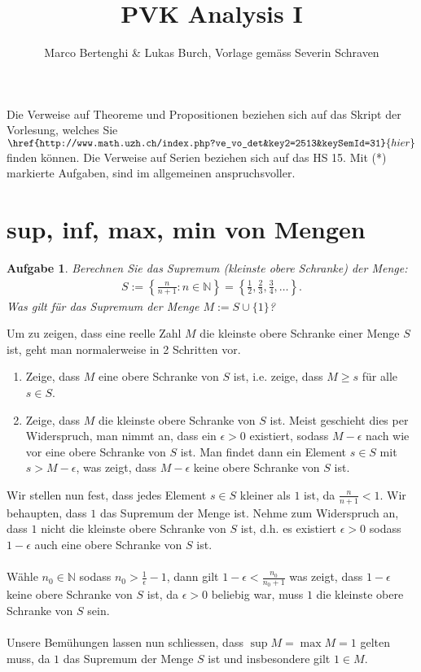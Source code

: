 \documentclass[a4paper, 20]{exam}
\newtheorem{ex}{Aufgabe}
\begin{document}
\title{PVK Analysis I}
\author{Marco Bertenghi \& Lukas Burch, Vorlage gemäss Severin Schraven}
\maketitle

Die Verweise auf Theoreme und Propositionen beziehen sich auf das Skript der Vorlesung, welches Sie $\href{http://www.math.uzh.ch/index.php?ve_vo_det&key2=2513&keySemId=31}{hier}$ finden k\"onnen. Die Verweise auf Serien beziehen sich auf das HS 15. Mit (*) markierte Aufgaben, sind im allgemeinen anspruchsvoller.


\section{sup, inf, max, min von Mengen}
\begin{ex} Berechnen Sie das Supremum (kleinste obere Schranke) der Menge: 
\begin{align*}
S:= \left\lbrace \frac{n}{n+1} : n \in \mathbb{N} \right\rbrace = \left\lbrace \frac{1}{2}, \frac{2}{3}, \frac{3}{4}, \dots \right \rbrace .
\end{align*}
Was gilt für das Supremum der Menge $M:= S \cup \lbrace 1 \rbrace$?
\end{ex}
\begin{solution} Um zu zeigen, dass eine reelle Zahl $M$ die kleinste obere Schranke einer Menge $S$ ist, geht man normalerweise in 2 Schritten vor. 
\begin{enumerate}
\item Zeige, dass $M$ eine obere Schranke von $S$ ist, i.e. zeige, dass $M \geq s$ für alle $s \in S$. 
\item Zeige,  dass $M$ die kleinste obere Schranke von $S$ ist. Meist geschieht dies per Widerspruch, man nimmt an, dass ein $\epsilon >0$ existiert, sodass $M- \epsilon$ nach wie vor eine obere Schranke von $S$ ist. Man findet dann ein Element $s \in S$ mit $s> M- \epsilon$, was zeigt, dass $M- \epsilon$ keine obere Schranke von $S$ ist. 
\end{enumerate}
Wir stellen nun fest, dass jedes Element $s \in S$ kleiner als $1$ ist,  da $\frac{n}{n+1} <1$. Wir behaupten,  dass $1$ das Supremum der Menge ist. Nehme zum Widerspruch an, dass $1$ nicht die kleinste obere Schranke von $S$ ist, d.h. es existiert $\epsilon >0$ sodass $1- \epsilon$ auch eine obere Schranke von $S$ ist. 
\\\\
Wähle $n_0 \in \mathbb{N}$ sodass $n_0 > \frac{1}{\epsilon}-1$, dann gilt $1- \epsilon < \frac{n_0}{n_0+1}$ was zeigt, dass $1- \epsilon$ keine obere Schranke von $S$ ist, da $\epsilon >0$ beliebig war, muss $1$ die kleinste obere Schranke von $S$ sein.
\\\\
Unsere Bemühungen lassen nun schliessen, dass $\sup M = \max M = 1$ gelten muss, da $1$ das Supremum der Menge $S$ ist und insbesondere gilt $ 1 \in M$. 
\end{solution}
\end{document}
